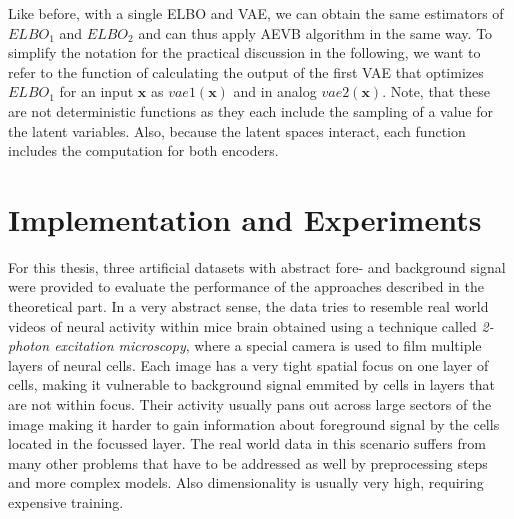 \documentclass[12pt]{report}
\theoremstyle{definition}
\begin{document}
Like before, with a single ELBO and VAE, we can obtain the same estimators of $ELBO_1$ and $ELBO_2$ and can thus apply AEVB algorithm in the same way. To simplify the notation for the practical discussion in the following, we want to refer to the function of calculating the output of the first VAE that optimizes $ELBO_1$ for an input $\mathbf{x}$ as $vae1(\mathbf{x})$ and in analog $vae2(\mathbf{x})$. Note, that these are not deterministic functions as they each include the sampling of a value for the latent variables. Also, because the latent spaces interact, each function includes the computation for both encoders.

\chapter{Implementation and Experiments}
For this thesis, three artificial datasets with abstract fore- and background signal were provided to evaluate the performance of the approaches described in the theoretical part. In a very abstract sense, the data tries to resemble real world videos of neural activity within mice brain obtained using a technique called \emph{2-photon excitation microscopy}, where a special camera is used to film multiple layers of neural cells. Each image has a very tight spatial focus on one layer of cells, making it vulnerable to background signal emmited by cells in layers that are not within focus. Their activity usually pans out across large sectors of the image making it harder to gain information about foreground signal by the cells located in the focussed layer. The real world data in this scenario suffers from many other problems that have to be addressed as well by preprocessing steps and more complex models. Also dimensionality is usually very high, requiring expensive training. 
\end{document}

